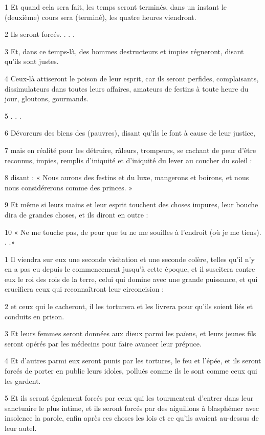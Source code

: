\par 1 Et quand cela sera fait, les temps seront terminés, dans un instant le (deuxième) cours sera (terminé), les quatre heures viendront.
\par 2 Ils seront forcés. . . .
\par 3 Et, dans ce temps-là, des hommes destructeurs et impies régneront, disant qu'ils sont justes.
\par 4 Ceux-là attiseront le poison de leur esprit, car ils seront perfides, complaisants, dissimulateurs dans toutes leurs affaires, amateurs de festins à toute heure du jour, gloutons, gourmands.
\par 5 . . .
\par 6 Dévoreurs des biens des (pauvres), disant qu'ils le font à cause de leur justice,
\par 7 mais en réalité pour les détruire, râleurs, trompeurs, se cachant de peur d'être reconnus, impies, remplis d'iniquité et d'iniquité du lever au coucher du soleil :
\par 8 disant : « Nous aurons des festins et du luxe, mangerons et boirons, et nous nous considérerons comme des princes. »
\par 9 Et même si leurs mains et leur esprit touchent des choses impures, leur bouche dira de grandes choses, et ils diront en outre :
\par 10 « Ne me touche pas, de peur que tu ne me souilles à l'endroit (où je me tiens). . .»


\par 1 Il viendra sur eux une seconde visitation et une seconde colère, telles qu'il n'y en a pas eu depuis le commencement jusqu'à cette époque, et il suscitera contre eux le roi des rois de la terre, celui qui domine avec une grande puissance, et qui crucifiera ceux qui reconnaîtront leur circoncision :
\par 2 et ceux qui le cacheront, il les torturera et les livrera pour qu'ils soient liés et conduits en prison.
\par 3 Et leurs femmes seront données aux dieux parmi les païens, et leurs jeunes fils seront opérés par les médecins pour faire avancer leur prépuce.
\par 4 Et d'autres parmi eux seront punis par les tortures, le feu et l'épée, et ils seront forcés de porter en public leurs idoles, pollués comme ils le sont comme ceux qui les gardent.
\par 5 Et ils seront également forcés par ceux qui les tourmentent d'entrer dans leur sanctuaire le plus intime, et ils seront forcés par des aiguillons à blasphémer avec insolence la parole, enfin après ces choses les lois et ce qu'ils avaient au-dessus de leur autel.

